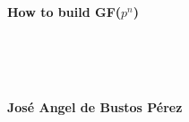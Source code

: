 \documentclass[a4paper,12pt]{report}
\begin{document}
\ \\ \\
\Huge
\textbf{How to build GF($p^n$)}
\begin{center}
\end{center}
\ \\ \\

\begin{flushright}
\Large
\ \\
\textbf{Jos\'e Angel de Bustos P\'erez}\\
\end{flushright}

\normalsize

\thispagestyle{empty}

\tableofcontents

%
%



%
%



%
%

%
\end{document}
